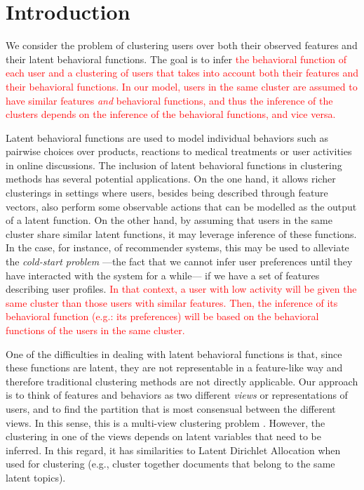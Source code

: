\documentclass[smallextended]{svjour3}          %
\newcommand\alberto[1]{\textcolor{red}{#1}}
\begin{document}
\section{Introduction}\label{sec:introduction}
We consider the problem of clustering users over both their observed features and their latent behavioral functions. The goal is to infer \alberto{the behavioral function of each user and a clustering of users that takes into account both their features and their behavioral functions. In our model, users in the same cluster are assumed to have similar features \textit{and} behavioral functions, and thus the inference of the clusters depends on the inference of the behavioral functions, and vice versa.} 

Latent behavioral functions are used to model individual behaviors such as pairwise choices over products, reactions to medical treatments or user activities in online discussions. 
The inclusion of latent behavioral functions in clustering methods has several potential applications. On the one hand, it allows richer clusterings in settings where users, besides being described through feature vectors, also perform some observable actions that can be modelled as the output of a latent function. On the other hand, by assuming that users in the same cluster share similar latent functions, it may leverage inference of these functions. In the case, for instance, of recommender systems, this may be used to alleviate the \textit{cold-start problem} ---the fact that we cannot infer user preferences until they have interacted with the system for a while--- if we have a set of features describing user profiles. \alberto{In that context, a user with low activity will be given the same cluster than those users with similar features. Then, the inference of its behavioral function (e.g.: its preferences) will be based on the behavioral functions of the users in the same cluster.} 

One of the difficulties in dealing with latent behavioral functions is that, since these functions are latent, they are not representable in a feature-like way and therefore traditional clustering methods are not directly applicable.
Our approach is to think of features and behaviors as two different \textit{views} or representations of users, and to find the partition that is most consensual between the different views. In this sense, this is a multi-view clustering problem \citep{SteffenandTobiasScheffer}. However, the clustering in one of the views depends on latent variables that need to be inferred. In this regard, it has similarities to Latent Dirichlet Allocation when used for clustering (e.g., cluster together documents that belong to the same latent topics).
\end{document}

